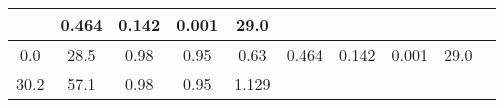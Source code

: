 \documentclass[a4paper,10pt]{article}
\begin{document}
\begin{longtable}{
     |
%    
    c|
%    
    c|
%    
    c|
%    
    c|
%    
    c|
%    
    c|
%    
    c|
%    
    c|
%    
    c|
%    
    c|
%    
    }
%        

%        
        & 0.464
%        

%        

%        
        & 0.142
%        

%        

%        
        & 0.001
%        

%        

%        
        & 29.0
%        

%        
        \\
        \hline

        

%        

%        
        0.0
%        

%        

%        
        & 28.5
%        

%        

%        
        & 0.98
%        

%        

%        
        & 0.95
%        

%        

%        
        & 0.63
%        

%        

%        
        & 0.464
%        

%        

%        
        & 0.142
%        

%        

%        
        & 0.001
%        

%        

%        
        & 29.0
%        

%        
        \\
        \hline

        

%        

%        
        30.2
%        

%        

%        
        & 57.1
%        

%        

%        
        & 0.98
%        

%        

%        
        & 0.95
%        

%        

%        
        & 1.129
%        


\end{longtable}
\end{document}

